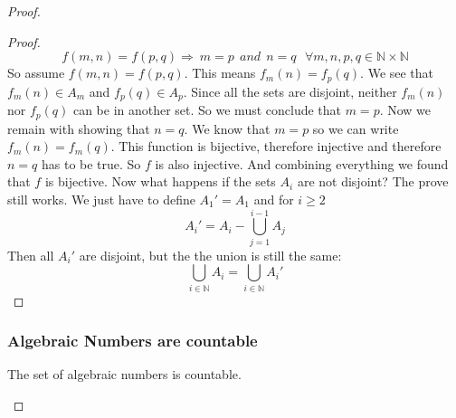 \documentclass{article}
\theoremstyle{definition}
\begin{document}
\begin{proof}
\begin{proof}
        \begin{equation}
        f(m,n) = f(p,q) \Rightarrow \: m = p \: \: and \: \: n = q \:  \: \:\forall m,n,p,q \in \mathbb{N} \times \mathbb{N}
    \end{equation}
    So assume $f(m,n) = f(p,q)$. This means $f_m(n)=f_p(q)$. We see that $f_m(n)\in A_m$ and $f_p(q)\in A_p$. Since all the sets are disjoint, neither $f_m(n)$ nor $f_p(q)$ can be in another set. So we must conclude that $m=p$. Now we remain with showing that $n=q$. We know that $m=p$ so we can write $f_m(n)=f_m(q)$. This function is bijective, therefore injective and therefore $n=q$ has to be true. So $f$ is also injective. And combining everything we found that $f$ is bijective. Now what happens if the sets $A_i$ are not disjoint? The prove still works. We just have to define $A_1'=A_1$ and for $i\geq 2$ 
    \begin{equation}
        A_i' = A_i - \bigcup _{j=1}^{i-1} A_j
    \end{equation}
    Then all $A_i' $ are disjoint, but the the union is still the same:
    \begin{equation}
        \bigcup_{i\in \mathbb{N}}A_i = \bigcup _{i\in \mathbb{N}}A_i'
    \end{equation}
\end{proof}

\subsubsection{Algebraic Numbers are countable}
\begin{theorem}
The set of algebraic numbers is countable.
\end{theorem}


\end{proof}
\end{document}
